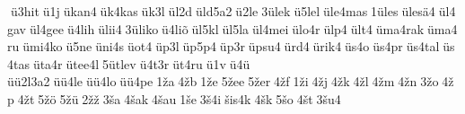  ü3hit ü1j ükan4 ük4kas ük3l ül2d üld5a2 ü2le 3ülek ü5lel üle4mas 1üles ülesä4 ül4gav ül4gee ü4lih ülii4 3üliko ü4liõ ül5kl ül5la ül4mei ülo4r ülp4 ült4 üma4rak üma4ru ümi4ko ü5ne üni4s üot4 üp3l üp5p4 üp3r üpsu4 ürd4 ürik4 üs4o üs4pr üs4tal üs4tas üta4r ütee4l 5ütlev ü4t3r üt4ru ü1v ü4ü 	üü2l3a2 üü4le üü4lo üü4pe 1ža 4žb 1že 5žee 5žer 4žf 1ži 4žj 4žk 4žl 4žm 4žn 3žo 4žp 4žt 5žö 5žü 2žž 3ša 4šak 4šau 1še 3š4i šis4k 4šk 5šo 4št 3šu4